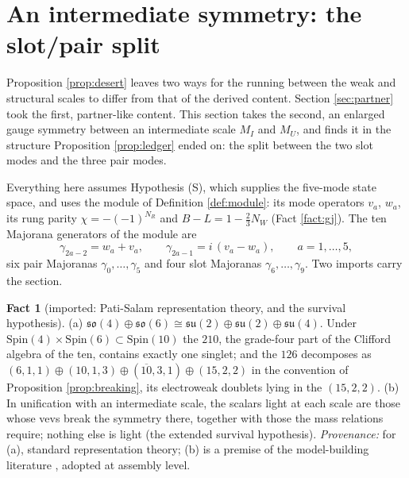 \documentclass[11pt]{article}
\theoremstyle{definition}
\newtheorem{fact}[theorem]{Fact}
\newcommand{\su}{\mathfrak{su}}
\begin{document}
\section{An intermediate symmetry: the slot/pair split}\label{sec:split}

Proposition \ref{prop:desert} leaves two ways for the running between the weak and structural scales to differ from that of the derived content. Section \ref{sec:partner} took the first, partner-like content. This section takes the second, an enlarged gauge symmetry between an intermediate scale $M_{I}$ and $M_{U}$, and finds it in the structure Proposition \ref{prop:ledger} ended on: the split between the two slot modes and the three pair modes.

Everything here assumes Hypothesis (S), which supplies the five-mode state space, and uses the module of Definition \ref{def:module}: its mode operators $v_{a}$, $w_{a}$, its rung parity $\chi = -(-1)^{N_{R}}$ and $B - L = 1 - \tfrac23 N_{W}$ (Fact \ref{fact:gj}). The ten Majorana generators of the module are
\[
\gamma_{2a-2} = w_{a} + v_{a}, \qquad \gamma_{2a-1} = i\,(v_{a} - w_{a}), \qquad a = 1, \ldots, 5,
\]
six pair Majoranas $\gamma_{0}, \ldots, \gamma_{5}$ and four slot Majoranas $\gamma_{6}, \ldots, \gamma_{9}$. Two imports carry the section.

\begin{fact}[imported: Pati-Salam representation theory, and the survival hypothesis]\label{fact:ps}
(a) $\mathfrak{so}(4) \oplus \mathfrak{so}(6) \cong \su(2) \oplus \su(2) \oplus \su(4)$. Under $\mathrm{Spin}(4) \times \mathrm{Spin}(6) \subset \mathrm{Spin}(10)$ the $210$, the grade-four part of the Clifford algebra of the ten, contains exactly one singlet; and the $126$ decomposes as $(6,1,1) \oplus (10,1,3) \oplus (\overline{10},3,1) \oplus (15,2,2)$ in the convention of Proposition \ref{prop:breaking}, its electroweak doublets lying in the $(15,2,2)$. (b) In unification with an intermediate scale, the scalars light at each scale are those whose vevs break the symmetry there, together with those the mass relations require; nothing else is light (the extended survival hypothesis). \emph{Provenance:} \cite{PatiSalam1974, Slansky1981} for (a), standard representation theory; (b) is a premise of the model-building literature \cite{BertoliniDiLuzioMalinsky2009}, adopted at assembly level.
\end{fact}
\end{document}
